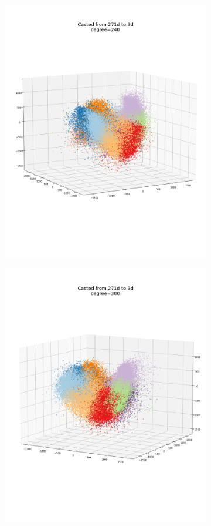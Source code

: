 \documentclass[12pt, a4paper]{article}
\begin{document}
\begin{figure}[h]
\begin{subfigure}{0.3\linewidth}
        \includegraphics[width=\linewidth]{images/q4/h/3dangle240.png}
    \end{subfigure}
    \hfill
    \begin{subfigure}{0.3\linewidth}
        \centering
        \includegraphics[width=\linewidth]{images/q4/h/3dangle300.png}

\end{subfigure}
\end{figure}
\end{document}
